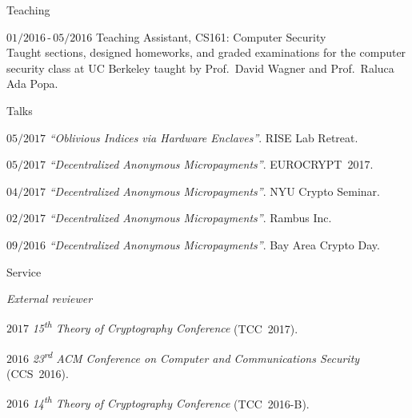 \documentclass[11pt]{article}
\begin{document}
\begin{cv}{\vspace{-5em}}
    \small
    \begin{bibunit}[alpha]
      \nocite{ChiesaGLMMM17, CarliniMVZSSWZ16, HoLMHSW16, PortnoffLEMLW15}
    \putbib[pubs]
    \end{bibunit}
  \begin{cvlist}{Teaching}
  \item[\small$01/2016$\,-\,$05/2016$] Teaching Assistant, \textsc{CS161}: Computer Security\\
    {\small
    Taught sections, designed homeworks, and graded examinations for the computer security class at UC Berkeley taught by Prof.~David Wagner and Prof.~Raluca Ada Popa.}
  \end{cvlist}
  \begin{cvlist}{Talks}
    \small
  \item[\small$05/2017$] \emph{``Oblivious Indices via Hardware Enclaves''}. RISE Lab Retreat.
  \item[\small$05/2017$] \emph{``Decentralized Anonymous Micropayments''}. EUROCRYPT~2017.
  \item[\small$04/2017$] \emph{``Decentralized Anonymous Micropayments''}. NYU Crypto Seminar.
  \item[\small$02/2017$] \emph{``Decentralized Anonymous Micropayments''}. Rambus Inc.
  \item[\small$09/2016$] \emph{``Decentralized Anonymous Micropayments''}. Bay Area Crypto Day.
  \end{cvlist}
  \begin{cvlist}{Service}
    \small
  \item[\emph{External reviewer}]
  \item[\small $2017$] \emph{15\textsuperscript{th} Theory of Cryptography Conference} (TCC~2017).
  \item[\small $2016$] \emph{23\textsuperscript{rd} ACM Conference on Computer and Communications Security} (CCS~2016).
  \item[\small $2016$] \emph{14\textsuperscript{th} Theory of Cryptography Conference} (TCC~2016-B).
  \end{cvlist}
\end{cv}
\end{document}
